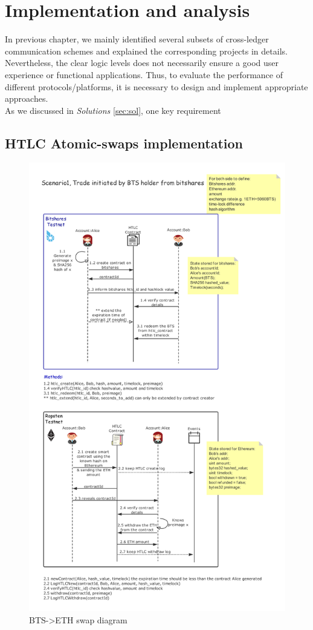 \chapter{Implementation and analysis} 
\label{chap:4}
\noindent In previous chapter, we mainly identified several subsets of cross-ledger communication schemes and explained the corresponding projects in details. Nevertheless, the clear logic levels does not necessarily ensure a good user experience or functional applications. Thus, to evaluate the performance of different protocols/platforms, it is necessary to design and implement appropriate approaches. \\
\noindent As we discussed in \textit{Solutions} \ref{sec:sol}, one key requirement 

\section{HTLC Atomic-swaps implementation}
\noindent 
\newpage
\begin{figure}[H]
	\includegraphics[width=1\textwidth]{./figures/BTS-ETH_diagram}
        \centering
        \caption{BTS->ETH swap diagram}
        \centering
        \label{fig:success}

\end{figure}
